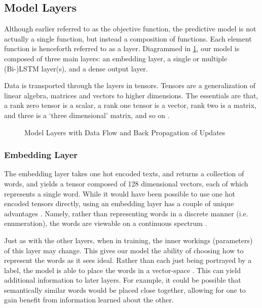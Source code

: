 \documentclass[titlepage,letterpaper]{article}
\begin{document}
\subsection{Model Layers}

Although earlier referred to as the objective function, the predictive model is not actually a single function, but instead a composition of functions. Each element function is henceforth referred to as a layer. Diagrammed in \cref{layers}, our model is composed of three main layers: an embedding layer, a single or multiple (Bi-)LSTM layer(s), and a dense output layer.

Data is transported through the layers in tensors\cite{tensorflow}. Tensors are a generalization of linear algebra, matrices and vectors to higher dimensions. The essentials are that, a rank zero tensor is a scalar, a rank one tensor is a vector, rank two is a matrix, and three is a `three dimensional' matrix, and so on \cite{tensors}. 

\begin{figure}[h]
	\centering
	\caption{Model Layers with Data Flow and Back Propagation of Updates \cite{knisely}}
	\label{layers}
	\def\svgwidth{3.5in}
	
\end{figure}




\subsubsection{Embedding Layer}

The embedding layer takes one hot encoded texts, and returns a collection of words, and yields a tensor composed of 128 dimensional vectors, each of which represents a single word. While it would have been possible to use one hot encoded tensors directly, using an embedding layer has a couple of unique advantages \cite{Keras.io}. Namely, rather than representing words in a discrete manner (i.e. enumeration), the words are viewable on a continuous spectrum \cite{dropout_embedding}.  

Just as with the other layers, when in training, the inner workings (parameters) of this layer may change. This gives our model the ability of choosing how to represent the words as it sees ideal. Rather than each just being portrayed by a label, the model is able to place the words in a vector-space \cite{embed}. This can yield additional information to later layers. For example, it could be possible that semantically similar words would be placed close together, allowing for one to gain benefit from information learned about the other.\cite{dropout_embedding,embed}
\end{document}

